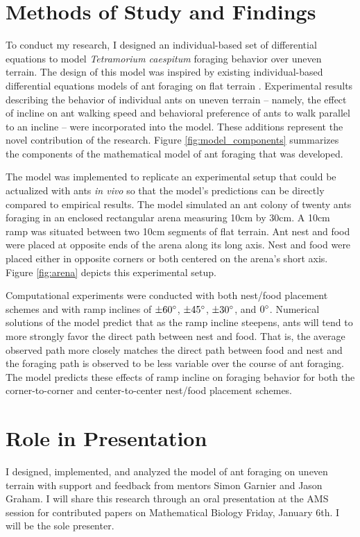 \documentclass{scrartcl}
\begin{document}
\section{Methods of Study and Findings}
To conduct my research, I designed an individual-based set of differential equations to model \textit{Tetramorium caespitum} foraging behavior over uneven terrain. The design of this model was inspired by existing individual-based differential equations models of ant foraging on flat terrain \cite{perna_individual_2012,ryan_model_2016}. Experimental results describing the behavior of individual ants on uneven terrain -- namely, the effect of incline on ant walking speed \cite{holt_locomotion_2012} and behavioral preference of ants to walk parallel to an incline \cite{khuong_how_2013} -- were incorporated into the model. These additions represent the novel contribution of the research. Figure \ref{fig:model_components} summarizes the components of the mathematical model of ant foraging that was developed.



The model was implemented to replicate an experimental setup that could be actualized with ants \textit{in vivo} so that the model's predictions can be directly compared to empirical results. The model simulated an ant colony of twenty ants foraging in an enclosed rectangular arena measuring 10cm by 30cm. A 10cm ramp was situated between two 10cm segments of flat terrain. Ant nest and food were placed at opposite ends of the arena along its long axis. Nest and food were placed either in opposite corners or both centered on the arena's short axis. Figure \ref{fig:arena} depicts this experimental setup.



Computational experiments were conducted with both nest/food placement schemes and with ramp inclines of $\pm 60\degree$, $\pm 45\degree$, $\pm 30\degree$, and $0\degree$. Numerical solutions of the model predict that as the ramp incline steepens, ants will tend to more strongly favor the direct path between nest and food. That is, the average observed path more closely matches the direct path between food and nest and the foraging path is observed to be less variable over the course of ant foraging. The model predicts these effects of ramp incline on foraging behavior for both the corner-to-corner and center-to-center nest/food placement schemes. 

\section{Role in Presentation}
I designed, implemented, and analyzed the model of ant foraging on uneven terrain with support and feedback from mentors Simon Garnier and Jason Graham. I will share this research through an oral presentation at the AMS session for contributed papers on Mathematical Biology Friday, January 6th. I will be the sole presenter.
\end{document}
